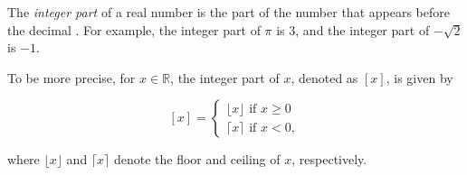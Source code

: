 \documentclass[12pt]{article}
\begin{document}
The \emph{integer part} of a real number is the part of the number that appears before the decimal .  For example, the integer part of $\pi$ is $3$, and the integer part of $-\sqrt{2}$ is $-1$.

To be more precise, for $x \in \mathbb{R}$, the integer part of $x$, denoted as $[x]$, is given by

$$[x]=\begin{cases}
\lfloor x \rfloor \text{ if } x \ge 0 \\
\lceil x \rceil \text{ if } x<0, \end{cases}$$

where $\lfloor x \rfloor$ and $\lceil x \rceil$ denote the floor and ceiling of $x$, respectively.
\end{document}
